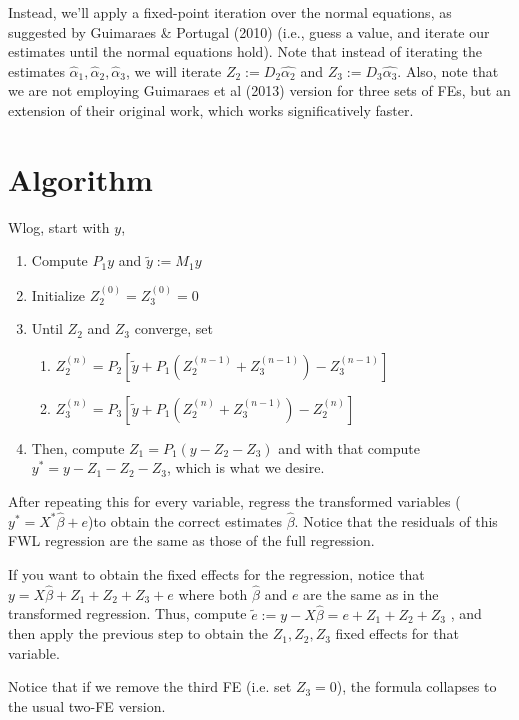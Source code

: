 \documentclass[11pt]{article}
\begin{document}
Instead, we'll apply a fixed-point iteration over the normal equations, as suggested by Guimaraes \& Portugal (2010) (i.e., guess a value, and iterate our estimates until the normal equations hold). Note that instead of iterating the estimates $\hat\alpha_1, \hat\alpha_2, \hat\alpha_3$, we will iterate $Z_2 := D_2\hat{\alpha_2}$ and $Z_3 := D_3\hat{\alpha_3}$. Also, note that we are not employing Guimaraes et al (2013) version for three sets of FEs, but an extension of their original work, which works significatively faster.

\section{Algorithm}

Wlog, start with $y$,

\begin{enumerate}
    \item Compute $P_1y$ and $\tilde{y} := M_1y$
    \item Initialize $Z_2^{(0)} = Z_3^{(0)} = 0$
    \item Until $Z_2$ and $Z_3$ converge, set
        \begin{enumerate}
        \item $Z_2^{(n)} = P_2 \left[ \tilde{y} + P_1 \left( Z_2^{(n-1)} + Z_3^{(n-1)} \right) - Z_3^{(n-1)} \right]$
        \item $Z_3^{(n)} = P_3 \left[ \tilde{y} + P_1 \left( Z_2^{(n)} + Z_3^{(n-1)} \right) - Z_2^{(n)} \right]$
        \end{enumerate}
    \item Then, compute $Z_1 = P_1(y - Z_2 - Z_3)$ and with that compute $y^* = y - Z_1 - Z_2 - Z_3$, which is what we desire.
\end{enumerate}

After repeating this for every variable, regress the transformed variables ($y^* = X^* \hat{\beta} + e$)to obtain the correct estimates $\hat{\beta}$. Notice that the residuals of this FWL regression are the same as those of the full regression.

If you want to obtain the fixed effects for the regression, notice that $y = X \hat{\beta} + Z_1 + Z_2 + Z_3 + e$ where both $\hat{\beta}$ and  $e$ are the same as in the transformed regression. Thus, compute $\tilde{e} := y - X \hat{\beta} = e + Z_1 + Z_2 + Z_3$ , and then apply the previous step to obtain the $Z_1, Z_2, Z_3$ fixed effects for that variable.

Notice that if we remove the third FE (i.e. set $Z_3=0$), the formula collapses to the usual two-FE version.
\end{document}
